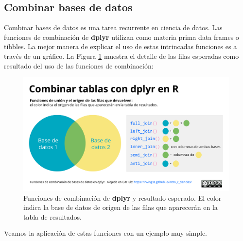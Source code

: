 \documentclass[
]{article}
\theoremstyle{definition}
\theoremstyle{definition}
\theoremstyle{definition}
\theoremstyle{definition}
\theoremstyle{remark}
\begin{document}
\hypertarget{combinar-bases-de-datos}{%
\subsection{Combinar bases de datos}\label{combinar-bases-de-datos}}

Combinar bases de datos es una tarea recurrente en ciencia de datos. Las funciones de combinación de \textbf{dplyr} utilizan como materia prima data frames o tibbles. La mejor manera de explicar el uso de estas intrincadas funciones es a través de un gráfico. La Figura \ref{fig:figura60} muestra el detalle de las filas esperadas como resultado del uso de las funciones de combinación:



\begin{figure}

{\centering \includegraphics[width=1\linewidth]{figs/elaboradas/Combinar datasets} 

}

\caption{Funciones de combinación de \textbf{dplyr} y resultado esperado. El color indica la base de datos de origen de las filas que aparecerán en la tabla de resultados.}\label{fig:figura60}
\end{figure}

Veamos la aplicación de estas funciones con un ejemplo muy simple.
\end{document}
